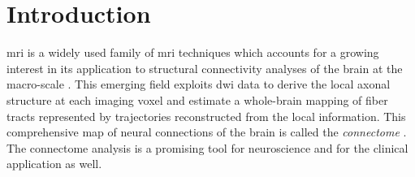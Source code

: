 \section{Introduction}
\label{sec:introduction}
% 
% 
% 
% 
%
 \gls{mri} is a widely used family
of \gls{mri} techniques \citep{sundgren_diffusion_2004} which 
accounts for a growing interest in its application to structural 
connectivity analyses of the brain at the macro-scale
\citep{craddock_imaging_2013}. This emerging field exploits
\gls{dwi} data to derive the local axonal structure at each imaging voxel 
\citep{basser_microstructural_2011} and estimate a whole-brain mapping of fiber 
tracts \citep{hagmann_mr_2012,johansen-berg_using_2009} represented by 
trajectories reconstructed from the local information.
This comprehensive map of neural connections of the brain is called the 
\emph{connectome} \citep{hagmann_diffusion_2005,sporns_human_2005}. The connectome
analysis is a promising tool for neuroscience \citep{morgan_why_2013} and 
for the clinical application \citep{griffa_structural_2013} as well.


